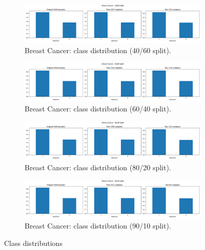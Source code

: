 \begin{figure}[H]
	\centering
	\begin{subfigure}{0.45\textwidth}
		\centering
		\includegraphics[width=\textwidth]{imgs/class_dist/class_dist__breast_cancer__40_vs_60.png}
		\caption{Breast Cancer: class distribution (40/60 split).}\label{fig:bc-cd-40-60}
	\end{subfigure}
	\hfill
	\begin{subfigure}{0.45\textwidth}
		\centering
		\includegraphics[width=\textwidth]{imgs/class_dist/class_dist__breast_cancer__60_vs_40.png}
		\caption{Breast Cancer: class distribution (60/40 split).}\label{fig:bc-cd-60-40}
	\end{subfigure}
	\hfill
	\begin{subfigure}{0.45\textwidth}
		\centering
		\includegraphics[width=\textwidth]{imgs/class_dist/class_dist__breast_cancer__80_vs_20.png}
		\caption{Breast Cancer: class distribution (80/20 split).}\label{fig:bc-cd-80-20}
	\end{subfigure}
	\hfill
	\begin{subfigure}{0.45\textwidth}
		\centering
		\includegraphics[width=\textwidth]{imgs/class_dist/class_dist__breast_cancer__90_vs_10.png}
		\caption{Breast Cancer: class distribution (90/10 split).}\label{fig:bc-cd-90-10}
	\end{subfigure}

	\caption{Class distributions}\label{fig:bc-cd-all}
\end{figure}

